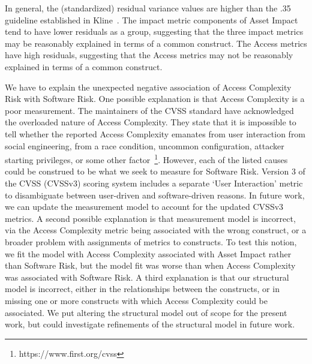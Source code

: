 In general, the (standardized) residual variance values are higher than the .35 guideline established in Kline~\cite{kline2015principles}. The impact metric components of Asset Impact tend to have lower residuals as a group, suggesting that the three impact metrics may be reasonably explained in terms of a common construct. The Access metrics have high residuals, suggesting that the Access metrics may not be reasonably explained in terms of a common construct. 

We have to explain the unexpected negative association of Access Complexity Risk with Software Risk. One possible explanation is that Access Complexity is a poor measurement. The maintainers of the CVSS standard have acknowledged the overloaded nature of Access Complexity.  They state that it is impossible to tell whether the reported Access Complexity emanates from user interaction from social engineering, from a race condition, uncommon configuration, attacker starting privileges, or some other factor~\footnote{https://www.first.org/cvss}. However, each of the listed causes could be construed to be what we seek to measure for Software Risk. Version 3 of the CVSS (CVSSv3) scoring system includes a separate `User Interaction' metric to disambiguate between user-driven and software-driven reasons. In future work, we can update the measurement model to account for the updated CVSSv3 metrics. A second possible explanation is that measurement model is incorrect, via the Access Complexity metric being associated with the wrong construct, or a broader problem with assignments of metrics to constructs. To test this notion, we fit the model with Access Complexity associated with Asset Impact rather than Software Risk, but the model fit was worse than when Access Complexity was associated with Software Risk. A third explanation is that our structural model is incorrect, either in the relationships between the constructs, or in missing one or more constructs with which Access Complexity could be associated. We put altering the structural model out of scope for the present work, but could investigate refinements of the structural model in future work. 

